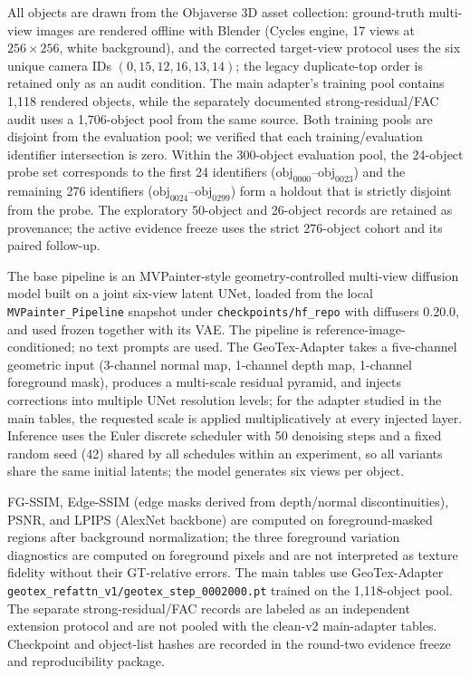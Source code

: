 \documentclass[times,twocolumn,final]{elsarticle}
\begin{document}
All objects are drawn from the Objaverse 3D asset collection: ground-truth multi-view images are rendered offline with Blender (Cycles engine, 17 views at $256\times256$, white background), and the corrected target-view protocol uses the six unique camera IDs $(0,15,12,16,13,14)$; the legacy duplicate-top order is retained only as an audit condition. The main adapter's training pool contains 1{,}118 rendered objects, while the separately documented strong-residual/FAC audit uses a 1{,}706-object pool from the same source. Both training pools are disjoint from the evaluation pool; we verified that each training/evaluation identifier intersection is zero. Within the 300-object evaluation pool, the 24-object probe set corresponds to the first 24 identifiers ($\mathrm{obj}_{0000}$--$\mathrm{obj}_{0023}$) and the remaining 276 identifiers ($\mathrm{obj}_{0024}$--$\mathrm{obj}_{0299}$) form a holdout that is strictly disjoint from the probe. The exploratory 50-object and 26-object records are retained as provenance; the active evidence freeze uses the strict 276-object cohort and its paired follow-up.

The base pipeline is an MVPainter-style geometry-controlled multi-view diffusion model built on a joint six-view latent UNet, loaded from the local \texttt{MVPainter\_Pipeline} snapshot under \texttt{checkpoints/hf\_repo} with diffusers 0.20.0, and used frozen together with its VAE. The pipeline is reference-image-conditioned; no text prompts are used. The GeoTex-Adapter takes a five-channel geometric input (3-channel normal map, 1-channel depth map, 1-channel foreground mask), produces a multi-scale residual pyramid, and injects corrections into multiple UNet resolution levels; for the adapter studied in the main tables, the requested scale is applied multiplicatively at every injected layer. Inference uses the Euler discrete scheduler with 50 denoising steps and a fixed random seed (42) shared by all schedules within an experiment, so all variants share the same initial latents; the model generates six views per object.

FG-SSIM, Edge-SSIM (edge masks derived from depth/normal discontinuities), PSNR, and LPIPS (AlexNet backbone) are computed on foreground-masked regions after background normalization; the three foreground variation diagnostics are computed on foreground pixels and are not interpreted as texture fidelity without their GT-relative errors. The main tables use GeoTex-Adapter \texttt{geotex\_refattn\_v1/geotex\_step\_0002000.pt} trained on the 1{,}118-object pool. The separate strong-residual/FAC records are labeled as an independent extension protocol and are not pooled with the clean-v2 main-adapter tables. Checkpoint and object-list hashes are recorded in the round-two evidence freeze and reproducibility package.
\end{document}

